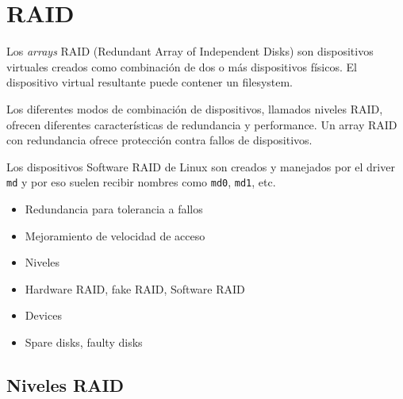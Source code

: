 
\section{RAID}

Los \emph{arrays} RAID (Redundant Array of Independent Disks) son dispositivos virtuales creados como combinación de dos o más dispositivos físicos. El dispositivo virtual resultante puede contener un filesystem. 

Los diferentes modos de combinación de dispositivos, llamados niveles RAID, ofrecen diferentes características de redundancia y performance. Un array RAID con redundancia ofrece protección contra fallos de dispositivos. 

Los dispositivos Software RAID de Linux son creados y manejados por el driver \lstinline{md} y por eso suelen recibir nombres como \lstinline{md0}, \lstinline{md1}, etc.

 
\begin{itemize}
	\item Redundancia para tolerancia a fallos
	\item Mejoramiento de velocidad de acceso
	\item Niveles 
	\item Hardware RAID, fake RAID, Software RAID
	\item Devices
	\item Spare disks, faulty disks
\end{itemize}



\subsection {Niveles RAID}

